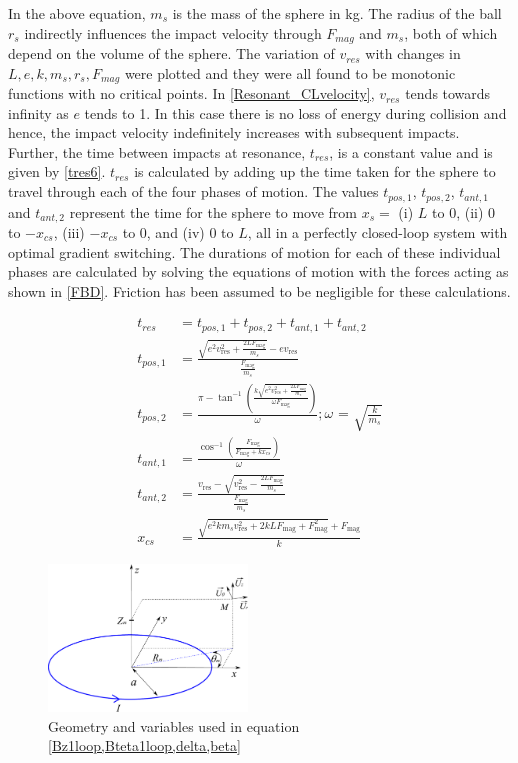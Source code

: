 \documentclass[letterpaper, 10 pt, conference]{ieeeconf}  %
\begin{document}
In the above equation, $m_s$ is the mass of the sphere in kg. The radius of the ball $r_s$ indirectly influences the impact velocity through $F_{mag}$ and $m_s$, both of which depend on the volume of the sphere. The variation of $v_{res}$ with changes in $L,e,k,m_s,r_s,F_{mag}$ were plotted and they were all found to be monotonic functions with no critical points. In \cref{Resonant_CLvelocity}, $v_{res}$ tends towards infinity as $e$ tends to 1. In this case there is no loss of energy during collision and hence, the impact velocity indefinitely increases with subsequent impacts. Further, the time between impacts at resonance, $t_{res}$, is a constant value and is given by \cref{tres6}. $t_{res}$ is calculated by adding up the time taken for the sphere to travel through each of the four phases of motion. The values $t_{pos,1}$, $t_{pos,2}$, $t_{ant,1}$ and $t_{ant,2}$ represent the time for the sphere to move from $x_s =$ (i) $L$ to 0, (ii) 0 to $-x_{cs}$, (iii) $-x_{cs}$ to 0, and (iv) 0 to $L$, all in a perfectly closed-loop system with optimal gradient switching. The durations of motion for each of these individual phases are calculated by solving the equations of motion with the forces acting as shown in \cref{FBD}. Friction has been assumed to be negligible for these calculations.


\begin{align}
\label{tres6}
t_{res}&=t_{pos,1}+t_{pos,2}+t_{ant,1}+t_{ant,2}\\
\label{tres1}
t_{pos,1}&=\frac{\sqrt{e^2 v_{\text{res}}^2+\frac{2 L F_{\text{mag}}}{m_s}}-e v_{\text{res}}}{\frac{F_{\text{mag}}}{m_s}}\\
t_{pos,2}&=\frac{\pi -\tan ^{-1}\left(\frac{k \sqrt{e^2 v_{\text{res}}^2+\frac{2 L F_{\text{mag}}}{m_s}}}{\omega  F_{\text{mag}}}\right)}{\omega } ; \text{$\omega $ = }
\sqrt{\frac{k}{m_s}}
\label{tres2}\\
t_{ant,1}&=\frac{\cos ^{-1}\left(\frac{F_{\text{mag}}}{F_{\text{mag}}+k x_{cs}}\right)}{\omega }
\label{tres3}\\
t_{ant,2}&=\frac{v_{\text{res}}-\sqrt{v_{\text{res}}^2-\frac{2 L F_{\text{mag}}}{m_s}}}{\frac{F_{\text{mag}}}{m_s}}
\label{tres4}\\
x_{cs}&=\frac{\sqrt{e^2 k m_s v_{\text{res}}^2+2 k L F_{\text{mag}}+F_{\text{mag}}^2}+F_{\text{mag}}}{k}
\label{tres5}
\end{align}
\begin{figure}\centering
	\includegraphics[width=150pt]{single_loop.pdf}
	\caption{Geometry and variables used in equation \cref{Bz1loop,Bteta1loop,delta,beta}}
	\label{single_loop_geometry}
	\vspace{-0.5em}
\end{figure}
\end{document}
